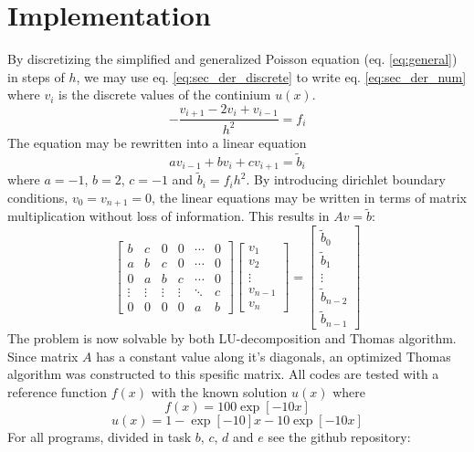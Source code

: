 \documentclass[twoside,twocolumn]{article}
\begin{document}
\section{Implementation}
By discretizing the simplified and generalized Poisson equation (eq. \ref{eq:general}) in steps of $h$, we may use eq. \ref{eq:sec_der_discrete} to write eq. \ref{eq:sec_der_num} where $v_i$ is the discrete values of the continium $u(x)$.
\begin{equation}
-\frac{v_{i+1}-2v_i+v_{i-1}}{h^2}=f_i \label{eq:sec_der_num}
\end{equation}
The equation may be rewritten into a linear equation
\begin{equation*}
av_{i-1}+bv_i+cv_{i+1}=\tilde{b}_i 
\end{equation*}
where $a=-1$, $b=2$, $c=-1$ and $\tilde{b}_i=f_ih^2$. By introducing dirichlet boundary conditions, $v_0=v_{n+1}=0$, the linear equations may be written in terms of matrix multiplication without loss of information. This results in $Av=\tilde{b}$:
\begin{equation}
\begin{bmatrix}
b&c&0&0&\cdots &0\\
a&b&c&0& \cdots & 0\\
0&a&b&c& \cdots & 0\\
\vdots&\vdots&\vdots&\vdots&\ddots&c\\
0&0&0&0&a&b
\end{bmatrix}
\begin{bmatrix}
v_1\\v_2\\\vdots\\v_{n-1}\\v_{n}
\end{bmatrix}=
\begin{bmatrix}
\tilde{b}_0\\\tilde{b}_1\\\vdots\\\tilde{b}_{n-2}\\\tilde{b}_{n-1}
\end{bmatrix} \label{eq:problem}
\end{equation}
The problem is now solvable by both LU-decomposition and Thomas algorithm. Since matrix $A$ has a constant value along it's diagonals, an optimized Thomas algorithm was constructed to this spesific matrix. All codes are tested with a reference function $f(x)$ with the known solution $u(x)$ where
\begin{equation*}
f(x)=100\exp[-10x]
\end{equation*}
\begin{equation*}
u(x)=1-\exp[-10]x-10\exp[-10x]
\end{equation*}
For all programs, divided in task $b$, $c$, $d$ and $e$ see the github repository: 
\end{document}
